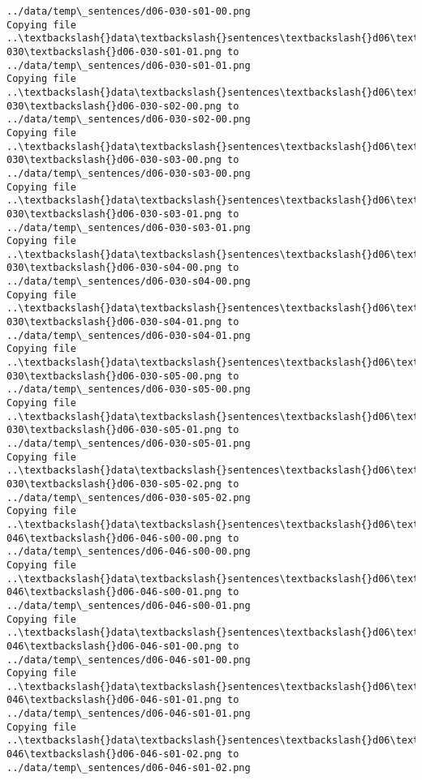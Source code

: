 \documentclass[11pt]{article}
\begin{document}
\begin{Verbatim}[commandchars=\\\{\}]
../data/temp\_sentences/d06-030-s01-00.png
Copying file ..\textbackslash{}data\textbackslash{}sentences\textbackslash{}d06\textbackslash{}d06-030\textbackslash{}d06-030-s01-01.png to
../data/temp\_sentences/d06-030-s01-01.png
Copying file ..\textbackslash{}data\textbackslash{}sentences\textbackslash{}d06\textbackslash{}d06-030\textbackslash{}d06-030-s02-00.png to
../data/temp\_sentences/d06-030-s02-00.png
Copying file ..\textbackslash{}data\textbackslash{}sentences\textbackslash{}d06\textbackslash{}d06-030\textbackslash{}d06-030-s03-00.png to
../data/temp\_sentences/d06-030-s03-00.png
Copying file ..\textbackslash{}data\textbackslash{}sentences\textbackslash{}d06\textbackslash{}d06-030\textbackslash{}d06-030-s03-01.png to
../data/temp\_sentences/d06-030-s03-01.png
Copying file ..\textbackslash{}data\textbackslash{}sentences\textbackslash{}d06\textbackslash{}d06-030\textbackslash{}d06-030-s04-00.png to
../data/temp\_sentences/d06-030-s04-00.png
Copying file ..\textbackslash{}data\textbackslash{}sentences\textbackslash{}d06\textbackslash{}d06-030\textbackslash{}d06-030-s04-01.png to
../data/temp\_sentences/d06-030-s04-01.png
Copying file ..\textbackslash{}data\textbackslash{}sentences\textbackslash{}d06\textbackslash{}d06-030\textbackslash{}d06-030-s05-00.png to
../data/temp\_sentences/d06-030-s05-00.png
Copying file ..\textbackslash{}data\textbackslash{}sentences\textbackslash{}d06\textbackslash{}d06-030\textbackslash{}d06-030-s05-01.png to
../data/temp\_sentences/d06-030-s05-01.png
Copying file ..\textbackslash{}data\textbackslash{}sentences\textbackslash{}d06\textbackslash{}d06-030\textbackslash{}d06-030-s05-02.png to
../data/temp\_sentences/d06-030-s05-02.png
Copying file ..\textbackslash{}data\textbackslash{}sentences\textbackslash{}d06\textbackslash{}d06-046\textbackslash{}d06-046-s00-00.png to
../data/temp\_sentences/d06-046-s00-00.png
Copying file ..\textbackslash{}data\textbackslash{}sentences\textbackslash{}d06\textbackslash{}d06-046\textbackslash{}d06-046-s00-01.png to
../data/temp\_sentences/d06-046-s00-01.png
Copying file ..\textbackslash{}data\textbackslash{}sentences\textbackslash{}d06\textbackslash{}d06-046\textbackslash{}d06-046-s01-00.png to
../data/temp\_sentences/d06-046-s01-00.png
Copying file ..\textbackslash{}data\textbackslash{}sentences\textbackslash{}d06\textbackslash{}d06-046\textbackslash{}d06-046-s01-01.png to
../data/temp\_sentences/d06-046-s01-01.png
Copying file ..\textbackslash{}data\textbackslash{}sentences\textbackslash{}d06\textbackslash{}d06-046\textbackslash{}d06-046-s01-02.png to
../data/temp\_sentences/d06-046-s01-02.png

\end{Verbatim}
\end{document}
